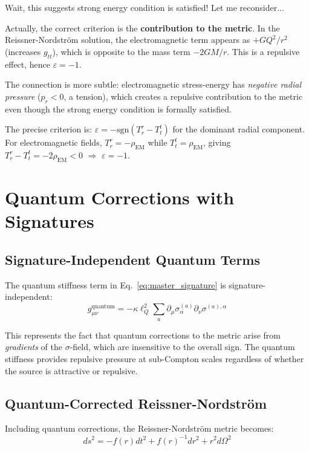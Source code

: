 \documentclass[11pt,a4paper]{article}
\theoremstyle{definition}
\theoremstyle{remark}
\begin{document}
		Wait, this suggests strong energy condition is satisfied! Let me reconsider...
		
		Actually, the correct criterion is the \textbf{contribution to the metric}. In the Reissner-Nordström solution, the electromagnetic term appears as $+GQ^2/r^2$ (increases $g_{tt}$), which is opposite to the mass term $-2GM/r$. This is a repulsive effect, hence $\varepsilon = -1$.
		
		The connection is more subtle: electromagnetic stress-energy has \emph{negative radial pressure} ($p_r < 0$, a tension), which creates a repulsive contribution to the metric even though the strong energy condition is formally satisfied.
	
		The precise criterion is: $\varepsilon = -\text{sgn}(T^r_r - T^t_t)$ for the dominant radial component. For electromagnetic fields, $T^r_r = -\rho_{\text{EM}}$ while $T^t_t = \rho_{\text{EM}}$, giving $T^r_r - T^t_t = -2\rho_{\text{EM}} < 0$ $\Rightarrow$ $\varepsilon = -1$.
	
	\section{Quantum Corrections with Signatures}
	
	\subsection{Signature-Independent Quantum Terms}
	
	The quantum stiffness term in Eq.~\eqref{eq:master_signature} is signature-independent:
	\begin{equation}
		g_{\mu\nu}^{\text{quantum}} = -\kappa\ell_Q^2\sum_a \partial_\mu\sigma_\alpha^{(a)}\partial_\nu\sigma^{(a),\alpha}
		\label{eq:quantum_signature}
	\end{equation}
	
	This represents the fact that quantum corrections to the metric arise from \emph{gradients} of the $\sigma$-field, which are insensitive to the overall sign. The quantum stiffness provides repulsive pressure at sub-Compton scales regardless of whether the source is attractive or repulsive.
	
	\subsection{Quantum-Corrected Reissner-Nordström}
	
	Including quantum corrections, the Reissner-Nordström metric becomes:
	\begin{equation}
		\boxed{ds^2 = -f(r)dt^2 + f(r)^{-1}dr^2 + r^2d\Omega^2}
	\end{equation}
	
\end{document}
